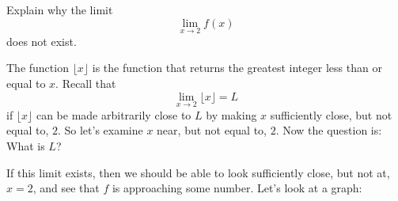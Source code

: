 \documentclass{ximera}
\begin{document}
\begin{example}
\begin{image}
\begin{tikzpicture}
\end{tikzpicture}
\end{image}
Explain why the limit
\[
\lim_{x\to 2} f(x)
\]
does not exist.
\begin{explanation}
The function $\lfloor x \rfloor$ is the function that returns the
greatest integer less than or equal to $x$. Recall that
\[
\lim_{x\to 2} \lfloor x \rfloor  = L
\]
if $\lfloor x\rfloor$ can be made arbitrarily close to $L$ by making
$x$ sufficiently close, but not equal to, $2$. So let's examine $x$
near, but not equal to, $2$. Now the question is: What is $L$?



If this limit exists, then we should be able to look sufficiently
close, but not at, $x=2$, and see that $f$ is approaching some number.
Let's look at a graph:
\begin{image}
\end{image}
\end{explanation}
\end{example}
\end{document}
